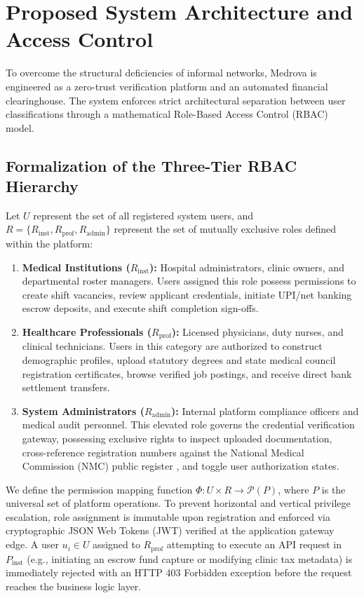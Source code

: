 \documentclass[conference]{IEEEtran}
\begin{document}
\section{Proposed System Architecture and Access Control}
To overcome the structural deficiencies of informal networks, Medrova is engineered as a zero-trust verification platform and an automated financial clearinghouse. The system enforces strict architectural separation between user classifications through a mathematical Role-Based Access Control (RBAC) model.

\subsection{Formalization of the Three-Tier RBAC Hierarchy}
Let $U$ represent the set of all registered system users, and $R = \{R_{\text{inst}}, R_{\text{prof}}, R_{\text{admin}}\}$ represent the set of mutually exclusive roles defined within the platform:
\begin{enumerate}
    \item \textbf{Medical Institutions ($R_{\text{inst}}$):} Hospital administrators, clinic owners, and departmental roster managers. Users assigned this role possess permissions to create shift vacancies, review applicant credentials, initiate UPI/net banking escrow deposits, and execute shift completion sign-offs.
    \item \textbf{Healthcare Professionals ($R_{\text{prof}}$):} Licensed physicians, duty nurses, and clinical technicians. Users in this category are authorized to construct demographic profiles, upload statutory degrees and state medical council registration certificates, browse verified job postings, and receive direct bank settlement transfers.
    \item \textbf{System Administrators ($R_{\text{admin}}$):} Internal platform compliance officers and medical audit personnel. This elevated role governs the credential verification gateway, possessing exclusive rights to inspect uploaded documentation, cross-reference registration numbers against the National Medical Commission (NMC) public register \cite{nmc2023register}, and toggle user authorization states.
\end{enumerate}

We define the permission mapping function $\Phi: U \times R \rightarrow \mathcal{P}(P)$, where $P$ is the universal set of platform operations. To prevent horizontal and vertical privilege escalation, role assignment is immutable upon registration and enforced via cryptographic JSON Web Tokens (JWT) verified at the application gateway edge. A user $u_i \in U$ assigned to $R_{\text{prof}}$ attempting to execute an API request in $P_{\text{inst}}$ (e.g., initiating an escrow fund capture or modifying clinic tax metadata) is immediately rejected with an HTTP 403 Forbidden exception before the request reaches the business logic layer.
\end{document}
